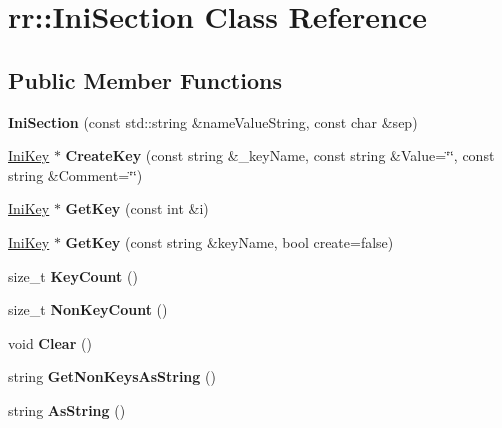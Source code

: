 \hypertarget{classrr_1_1_ini_section}{\section{rr\-:\-:Ini\-Section Class Reference}
\label{classrr_1_1_ini_section}
}
\subsection*{Public Member Functions}
\begin{DoxyCompactItemize}
\item 
\hypertarget{classrr_1_1_ini_section_aa77ce6b9a237b024621af4400023d401}{{\bfseries Ini\-Section} (const std\-::string \&name\-Value\-String, const char \&sep)}\label{classrr_1_1_ini_section_aa77ce6b9a237b024621af4400023d401}

\item 
\hypertarget{classrr_1_1_ini_section_a3b5b12a47976000a3c4bfa6a77283fe4}{\hyperlink{classrr_1_1_ini_key}{Ini\-Key} $\ast$ {\bfseries Create\-Key} (const string \&\-\_\-key\-Name, const string \&Value=\char`\"{}\char`\"{}, const string \&Comment=\char`\"{}\char`\"{})}\label{classrr_1_1_ini_section_a3b5b12a47976000a3c4bfa6a77283fe4}

\item 
\hypertarget{classrr_1_1_ini_section_abc0fbaaae8bb21b40e5e3a3c71ebfbb1}{\hyperlink{classrr_1_1_ini_key}{Ini\-Key} $\ast$ {\bfseries Get\-Key} (const int \&i)}\label{classrr_1_1_ini_section_abc0fbaaae8bb21b40e5e3a3c71ebfbb1}

\item 
\hypertarget{classrr_1_1_ini_section_a26dad6c933841e28343c44fbe57802b0}{\hyperlink{classrr_1_1_ini_key}{Ini\-Key} $\ast$ {\bfseries Get\-Key} (const string \&key\-Name, bool create=false)}\label{classrr_1_1_ini_section_a26dad6c933841e28343c44fbe57802b0}

\item 
\hypertarget{classrr_1_1_ini_section_ac46e9a424738d99e3ccf4d78dfdbde7c}{size\-\_\-t {\bfseries Key\-Count} ()}\label{classrr_1_1_ini_section_ac46e9a424738d99e3ccf4d78dfdbde7c}

\item 
\hypertarget{classrr_1_1_ini_section_ab270d8747e58310b4e5e23f8717594e4}{size\-\_\-t {\bfseries Non\-Key\-Count} ()}\label{classrr_1_1_ini_section_ab270d8747e58310b4e5e23f8717594e4}

\item 
\hypertarget{classrr_1_1_ini_section_a2e0183fcbd33de05c7bec177768dcab8}{void {\bfseries Clear} ()}\label{classrr_1_1_ini_section_a2e0183fcbd33de05c7bec177768dcab8}

\item 
\hypertarget{classrr_1_1_ini_section_a71a2b41ef41c960aa41f7c6a8a6bd53e}{string {\bfseries Get\-Non\-Keys\-As\-String} ()}\label{classrr_1_1_ini_section_a71a2b41ef41c960aa41f7c6a8a6bd53e}

\item 
\hypertarget{classrr_1_1_ini_section_a5fa1c847673ca3ff300932e25fbea2cc}{string {\bfseries As\-String} ()}\label{classrr_1_1_ini_section_a5fa1c847673ca3ff300932e25fbea2cc}

\end{DoxyCompactItemize}
